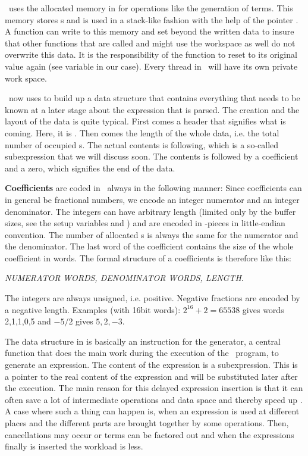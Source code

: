 \FORM\ uses the allocated memory in  for operations like the
generation of terms. This memory stores s and is used in a stack-like
fashion with the help of the pointer . A function can write to
this memory and set  beyond the written data to insure that
other functions that are called and might use the workspace as well do not
overwrite this data. It is the responsibility of the function to reset
 to its original value again (see variable  in our
case). Every thread in \TFORM\ will have its own private work space.

\FORM\ now uses  to build up a data structure that contains
everything that needs to be known at a later stage about the expression that is
parsed. The creation and the layout of the data is quite typical. First comes a
header that signifies what is coming. Here, it is . Then comes
the length of the whole data, i.e. the total number of occupied s. The
actual contents is following, which is a so-called subexpression that we will
discuss soon. The contents is followed by a coefficient and a zero, which
signifies the end of the data.

{\bf Coefficients} are coded in \FORM\ always in the following manner: Since
coefficients can in general be fractional numbers, we encode an integer
numerator and an integer denominator. The integers can have arbitrary length
(limited only by the buffer sizes, see the setup variables  and
) and are encoded in -pieces in little-endian convention.
The number of allocated s is always the same for the numerator and the
denominator. The last word of the coefficient contains the size of the whole
coefficient in words. The formal structure of a coefficients is therefore like
this:
\begin{center}
{\it NUMERATOR WORDS, DENOMINATOR WORDS, LENGTH}.
\end{center}
The integers are always
unsigned, i.e. positive. Negative fractions are encoded by a negative length.
Examples (with 16bit words): $2^{16}+2 = 65538$ gives words 2,1,1,0,5 and $-5/2$
gives $5,2,-3$.

The data structure in  is basically an instruction for the
generator, a central function that does the main work during the execution of
the \FORM\ program, to generate an expression. The content of the expression is
a subexpression. This is a pointer to the real content of the expression and
will be substituted later after the execution. The main reason for this delayed
expression insertion is that it can often save a lot of intermediate operations
and data space and thereby speed up \FORM. A case where such a thing can happen
is, when an expression is used at different places and the different parts are
brought together by some operations. Then, cancellations may occur or terms can
be factored out and when the expressions finally is inserted the workload is
less.

